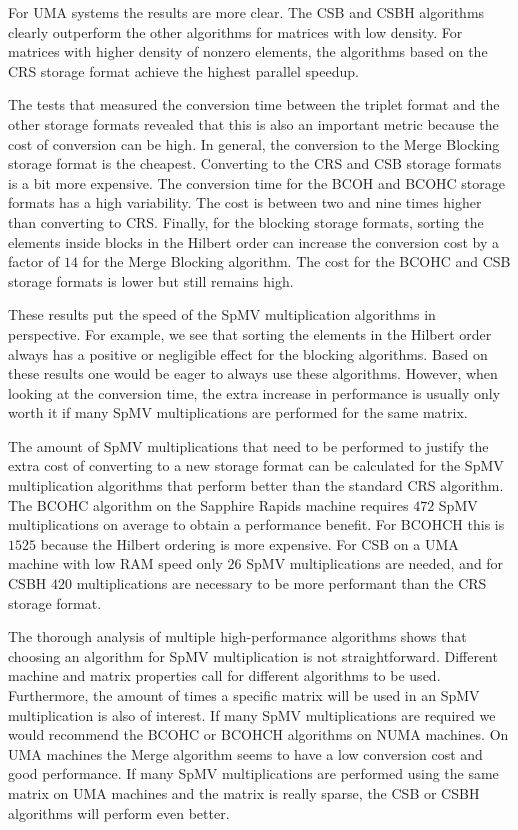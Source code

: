 \documentclass{siamart220329}
\begin{document}
For UMA systems the results are more clear. The CSB and CSBH algorithms clearly outperform the other algorithms for matrices with low density. For matrices with higher density of nonzero elements, the algorithms based on the CRS storage format achieve the highest parallel speedup.

The tests that measured the conversion time between the triplet format and the other storage formats revealed that this is also an important metric because the cost of conversion can be high. In general, the conversion to the Merge Blocking storage format is the cheapest. Converting to the CRS and CSB storage formats is a bit more expensive. The conversion time for the BCOH and BCOHC storage formats has a high variability. The cost is between two and nine times higher than converting to CRS. Finally, for the blocking storage formats, sorting the elements inside blocks in the Hilbert order can increase the conversion cost by a factor of $14$ for the Merge Blocking algorithm. The cost for the BCOHC and CSB storage formats is lower but still remains high.

These results put the speed of the SpMV multiplication algorithms in perspective. For example, we see that sorting the elements in the Hilbert order always has a positive or negligible effect for the blocking algorithms. Based on these results one would be eager to always use these algorithms. However, when looking at the conversion time, the extra increase in performance is usually only worth it if many SpMV multiplications are performed for the same matrix. 

The amount of SpMV multiplications that need to be performed to justify the extra cost of converting to a new storage format can be calculated for the SpMV multiplication algorithms that perform better than the standard CRS algorithm. The BCOHC algorithm on the Sapphire Rapids machine requires $472$ SpMV multiplications on average to obtain a performance benefit. For BCOHCH this is $1525$ because the Hilbert ordering is more expensive. For CSB on a UMA machine with low RAM speed only $26$ SpMV multiplications are needed, and for CSBH $420$ multiplications are necessary to be more performant than the CRS storage format.

The thorough analysis of multiple high-performance algorithms shows that choosing an algorithm for SpMV multiplication is not straightforward. Different machine and matrix properties call for different algorithms to be used. Furthermore, the amount of times a specific matrix will be used in an SpMV multiplication is also of interest. If many SpMV multiplications are required we would recommend the BCOHC or BCOHCH algorithms on NUMA machines. On UMA machines the Merge algorithm seems to have a low conversion cost and good performance. If many SpMV multiplications are performed using the same matrix on UMA machines and the matrix is really sparse, the CSB or CSBH algorithms will perform even better.
\end{document}
